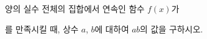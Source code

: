양의 실수 전체의 집합에서 연속인 함수 $f(x)$가 \par\smallskip{}\par\smallskip\noindent 를 만족시킬 때, 상수 $a$, $b$에 대하여 $ab$의 값을 구하시오.
